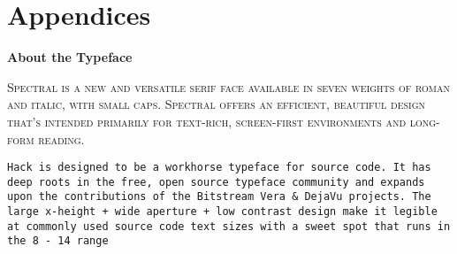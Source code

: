 \setcounter{footnote}{0}
\setcounter{section}{1}



\mainmatter
\renewcommand{\thefootnote}{\arabic{footnote}}











\part*{Appendices}
\appendix


\newpage
\backmatter

\titleformat{\chapter}[hang]{\Large}{\filright\enspace\thechapter\enspace}{2.5cm}{\Large\bfseries\filcenter}
\printbibliography

\newpage
{}
\vspace*{0.075\paperheight}
\begin{center}\bfseries
About the Typeface
\end{center}
\noindent\hfil\parbox[c][1.1\height][c]{0.5\textwidth}{\small\textsc{%
Spectral is a new and versatile serif face available in seven weights of roman and italic, with small caps.
Spectral offers an efficient, beautiful design that’s intended primarily for text-rich, screen-first environments and long-form reading.}

\vspace*{1.5\baselineskip}

\texttt{Hack is designed to be a workhorse typeface for source code.
It has deep roots in the free, open source typeface community and expands upon the contributions of the Bitstream Vera \& DejaVu projects.
The large x-height + wide aperture + low contrast design make it legible at commonly used source code text sizes with a sweet spot that runs in the 8 - 14 range}}

